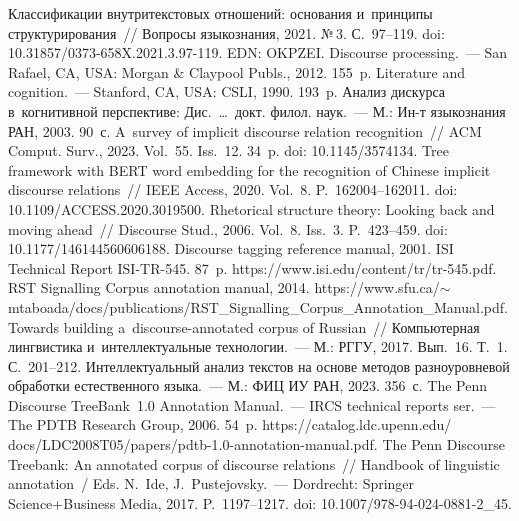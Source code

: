 \begin{multicols}{2}
{\small\frenchspacing
 {\baselineskip=11.5pt
 \begin{thebibliography}{99}
 Классификации внутритекстовых отношений: основания и~принципы 
структурирования~// Вопросы языкознания, 2021. №\,3. С.~97--119. doi: 10.31857/0373-658X.2021.3.97-119. EDN: OKPZEI.
 Discourse processing.~--- San Rafael, CA, USA: Morgan \& Claypool Publs., 
2012. 155~p.
 Literature and cognition.~--- Stanford, CA, USA: CSLI, 1990. 193~p.
 Анализ дискурса в~когнитивной перспективе: Дис.\ \ldots\ докт. филол. наук.~--- 
М.: Ин-т языкознания РАН, 2003. 90~с.
 A~survey of implicit discourse relation recognition~// ACM 
Comput. Surv., 2023. Vol.~55. Iss.~12. 34~p. doi: 10.1145/3574134.
 Tree framework with BERT word embedding for the recognition of 
Chinese implicit discourse relations~// IEEE Access, 2020. Vol.~8. P.~162004--162011. doi: 
10.1109/ACCESS.2020.3019500.
 Rhetorical structure theory: Looking back and moving ahead~// 
Discourse Stud., 2006. Vol.~8. Iss.~3. P.~423--459. doi: 10.1177/146144560606188.
 Discourse tagging reference manual, 2001.  ISI Technical Report ISI-TR-545. 87~p.
{\sf https://www.isi.edu/content/tr/tr-545.pdf}.
 RST Signalling Corpus annotation manual, 2014. 
{\sf https://www.sfu.ca/$\sim$mtaboada/\linebreak docs/publications/RST\_Signalling\_Corpus\_Annotation\_\linebreak Manual.pdf}.
 Towards building a~discourse-annotated corpus of Russian~// Компьютерная 
лингвистика и~интеллектуальные технологии.~--- М.: \mbox{РГГУ}, 2017.  Вып.~16.  Т.~1.   С.~201--212.
 Интеллектуальный анализ текстов на основе методов разноуровневой 
обработки естественного языка.~--- М.: ФИЦ ИУ РАН, 2023. 356~с.
 The Penn Discourse 
TreeBank~1.0 Annotation Manual.~--- IRCS technical reports ser.~--- The PDTB Research Group, 2006. 54~p.
{\sf https://catalog.ldc.upenn.edu/ docs/LDC2008T05/papers/pdtb-1.0-annotation-manual.pdf}.
 The Penn Discourse Treebank: An annotated corpus of 
discourse relations~// Handbook of linguistic annotation~/
Eds. N.~Ide, J.~Pustejovsky.~--- Dordrecht: Springer Science\;+\;Business Media, 2017. P.~1197--1217. doi: 10.1007/978-94-024-0881-2\_45.



\end{thebibliography}}}
\end{multicols}
